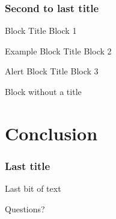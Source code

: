 \documentclass[
    11pt, %
    aspectratio=169, %
]{beamer}
\begin{document}
\begin{frame}
	\frametitle{Second to last title}
    	\begin{block}{Block Title}
    		Block 1
    	\end{block}
    	
    	\begin{exampleblock}{Example Block Title}
    		Block 2
    	\end{exampleblock}
    	
    	\begin{alertblock}{Alert Block Title}
    		Block 3
    	\end{alertblock}
    	
    	\begin{block}{} %
    		Block without a title
    	\end{block}
\end{frame}

\section{Conclusion}
\begin{frame}
	\frametitle{Last title}
		
	Last bit of text

\end{frame}


\appendix
{}

\begin{frame}[noframenumbering] %

	\begin{center}
            {\LARGE Questions?}
	\end{center}
 
\end{frame}

\end{document}
